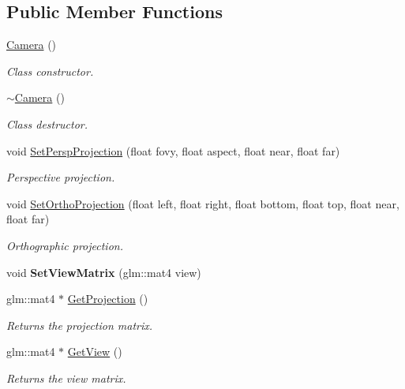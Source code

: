 \subsection*{Public Member Functions}
\begin{DoxyCompactItemize}
\item 
\hyperlink{class_camera_a01f94c3543f56ede7af49dc778f19331}{Camera} ()
\begin{DoxyCompactList}\small\item\em Class constructor. \end{DoxyCompactList}\item 
\hyperlink{class_camera_ad1897942d0ccf91052386388a497349f}{$\sim$\+Camera} ()
\begin{DoxyCompactList}\small\item\em Class destructor. \end{DoxyCompactList}\item 
void \hyperlink{class_camera_ab8bb3c4e5dd304753fc6a2937175d1d9}{Set\+Persp\+Projection} (float fovy, float aspect, float near, float far)
\begin{DoxyCompactList}\small\item\em Perspective projection. \end{DoxyCompactList}\item 
void \hyperlink{class_camera_aaee3d9ca2a77a31574da1e927047af84}{Set\+Ortho\+Projection} (float left, float right, float bottom, float top, float near, float far)
\begin{DoxyCompactList}\small\item\em Orthographic projection. \end{DoxyCompactList}\item 
\mbox{\label{class_camera_aaeadc93f9c5800d2b52af7f88c3ede5a}} 
void {\bfseries Set\+View\+Matrix} (glm\+::mat4 view)
\item 
glm\+::mat4 $\ast$ \hyperlink{class_camera_a0a515e9b67a4f4f9d012209431e45448}{Get\+Projection} ()
\begin{DoxyCompactList}\small\item\em Returns the projection matrix. \end{DoxyCompactList}\item 
glm\+::mat4 $\ast$ \hyperlink{class_camera_a7a1951025a21533f97f06071df681f7b}{Get\+View} ()
\begin{DoxyCompactList}\small\item\em Returns the view matrix. \end{DoxyCompactList}\end{DoxyCompactItemize}

